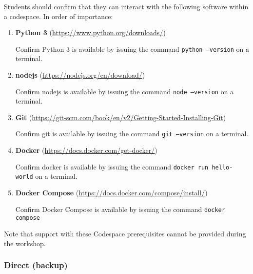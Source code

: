\documentclass{article}
\begin{document}
Students should confirm that they can interact with the following software within a codespace.
In order of importance:

\begin{enumerate}

    \item \textbf{Python 3}
    (\href{https://www.python.org/downloads/}{https://www.python.org/downloads/})

    Confirm Python 3 is available by issuing the command
    \texttt{python --version} on a terminal.

    \item \textbf{nodejs}
    (\href{https://nodejs.org/en/download/}{https://nodejs.org/en/download/})

    Confirm nodejs is available by issuing the command
    \texttt{node --version} on a terminal.

    \item \textbf{Git}
    (\href{https://git-scm.com/book/en/v2/Getting-Started-Installing-Git}{https://git-scm.com/book/en/v2/Getting-Started-Installing-Git})

    Confirm git is available by issuing the command
    \texttt{git --version} on a terminal.

    \item \textbf{Docker}
    (\href{https://docs.docker.com/get-docker/}{https://docs.docker.com/get-docker/})

    Confirm docker is available by issuing the command
    \texttt{docker run hello-world} on a terminal.

    \item \textbf{Docker Compose}
    (\href{https://docs.docker.com/compose/install/}{https://docs.docker.com/compose/install/})

    Confirm Docker Compose is available by issuing the command \newline
    \texttt{docker compose}

\end{enumerate}

Note that support with these Codespace prerequisites cannot be provided during the workshop.

\subsubsection{Direct (backup)}
\end{document}
